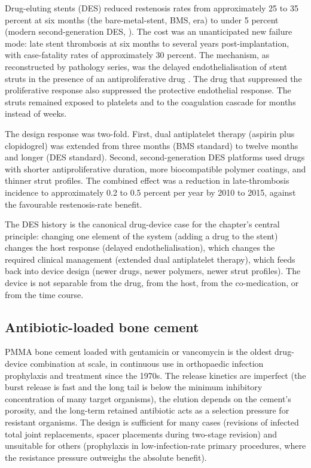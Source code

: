 Drug-eluting stents (DES) reduced restenosis rates from
approximately 25 to 35 percent at six months (the bare-metal-stent,
BMS, era) to under 5 percent (modern second-generation DES,
\cite{paper:v6c12-stone-des-2010}). The cost was an unanticipated
new failure mode: late stent thrombosis at six months to several
years post-implantation, with case-fatality rates of approximately
30 percent. The mechanism, as reconstructed by pathology series,
was the delayed endothelialisation of stent struts in the
presence of an antiproliferative drug
\cite{paper:v6c12-finn-des-pathology-2007}. The drug that suppressed
the proliferative response also suppressed the protective
endothelial response. The struts remained exposed to platelets and
to the coagulation cascade for months instead of weeks.

The design response was two-fold. First, dual antiplatelet therapy
(aspirin plus clopidogrel) was extended from three months (BMS
standard) to twelve months and longer (DES standard). Second,
second-generation DES platforms used drugs with shorter
antiproliferative duration, more biocompatible polymer coatings,
and thinner strut profiles. The combined effect was a reduction
in late-thrombosis incidence to approximately 0.2 to 0.5 percent
per year by 2010 to 2015, against the favourable restenosis-rate
benefit.

The DES history is the canonical drug-device case for the
chapter's central principle: changing one element of the system
(adding a drug to the stent) changes the host response (delayed
endothelialisation), which changes the required clinical management
(extended dual antiplatelet therapy), which feeds back into device
design (newer drugs, newer polymers, newer strut profiles). The
device is not separable from the drug, from the host, from the
co-medication, or from the time course.

\subsection{Antibiotic-loaded bone cement}

PMMA bone cement loaded with gentamicin or vancomycin is the
oldest drug-device combination at scale, in continuous use in
orthopaedic infection prophylaxis and treatment since the 1970s.
The release kinetics are imperfect (the burst release is fast and
the long tail is below the minimum inhibitory concentration of
many target organisms), the elution depends on the cement's
porosity, and the long-term retained antibiotic acts as a selection
pressure for resistant organisms. The design is sufficient for
many cases (revisions of infected total joint replacements,
spacer placements during two-stage revision) and unsuitable for
others (prophylaxis in low-infection-rate primary procedures,
where the resistance pressure outweighs the absolute benefit).

